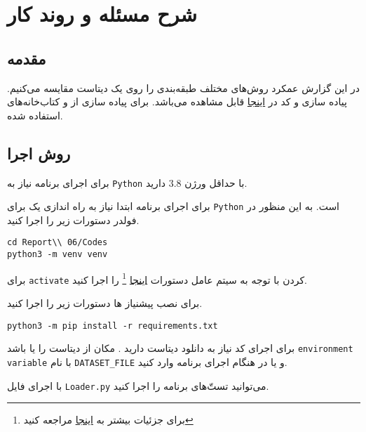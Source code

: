 \chapter{شرح مسئله و روند کار}

\section{مقدمه}
در این گزارش عمکرد روش‌های مختلف طبقه‌بندی را روی یک دیتاست مقایسه می‌کنیم.
پیاده سازی و کد در
\href{https://github.com/atrin-hojjat/Uni-AI-Course-Reports/blob/main/Report\%2007/}{اینجا}
قابل مشاهده می‌باشد.
برای پیاده سازی
از
و کتاب‌خانه‌های
استفاده شده.

\section{روش اجرا}
برای اجرای برنامه نیاز به 
\verb;Python;
با حداقل ورژن 
$3.8$
دارید.

برای اجرای برنامه ابتدا نیاز به راه اندازی یک
برای 
\verb;Python;
است.
به این منظور در فولدر
دستورات زیر را اجرا کنید.

\lstset{language=bash}
\begin{latin}
\begin{lstlisting}
cd Report\\ 06/Codes
python3 -m venv venv
\end{lstlisting}
\end{latin}

برای 
\verb;activate;
کردن با توجه به سیتم عامل دستورات
\href{https://packaging.python.org/guides/installing-using-pip-and-virtual-environments/}{اینجا}
\footnote{برای جزئیات بیشتر به 
\href{https://docs.python.org/3/library/venv.html}{اینجا}
 مراجعه کنید
 }
را اجرا کنید.

برای نصب پیشنیاز ها دستورات زیر را اجرا کنید.

\begin{latin}
\begin{lstlisting}
python3 -m pip install -r requirements.txt
\end{lstlisting}
\end{latin}


برای اجرای کد نیاز به دانلود‌ دیتا‌ست دارید
.
مکان از دیتاست را یا باشد
\verb;environment variable;
با نام
\verb;DATASET_FILE;
و یا در هنگام اجرای برنامه وارد کنید.

با اجرای فایل
\verb;Loader.py;
می‌توانید تست‌ّهای برنامه را اجرا کنید.

